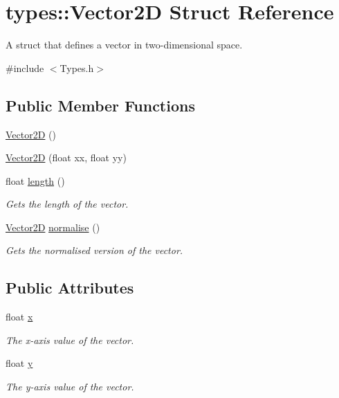 \hypertarget{structtypes_1_1_vector2_d}{}\section{types\+:\+:Vector2\+D Struct Reference}
\label{structtypes_1_1_vector2_d}


A struct that defines a vector in two-\/dimensional space.  




{\ttfamily \#include $<$Types.\+h$>$}

\subsection*{Public Member Functions}
\begin{DoxyCompactItemize}
\item 
\hyperlink{structtypes_1_1_vector2_d_adda77a848bdd16a1a5ef040f6b2eb22a}{Vector2\+D} ()
\item 
\hyperlink{structtypes_1_1_vector2_d_a45963f2c1d710efa66c4e43ca84537f3}{Vector2\+D} (float xx, float yy)
\item 
float \hyperlink{structtypes_1_1_vector2_d_ac46977660e97a02defb9410870b287b7}{length} ()
\begin{DoxyCompactList}\small\item\em Gets the length of the vector. \end{DoxyCompactList}\item 
\hyperlink{structtypes_1_1_vector2_d}{Vector2\+D} \hyperlink{structtypes_1_1_vector2_d_a22ca9b713366281646e78f5e0287b008}{normalise} ()
\begin{DoxyCompactList}\small\item\em Gets the normalised version of the vector. \end{DoxyCompactList}\end{DoxyCompactItemize}
\subsection*{Public Attributes}
\begin{DoxyCompactItemize}
\item 
float \hyperlink{structtypes_1_1_vector2_d_a44560592e290e47cf312c76931cace2d}{x}
\begin{DoxyCompactList}\small\item\em The x-\/axis value of the vector. \end{DoxyCompactList}\item 
float \hyperlink{structtypes_1_1_vector2_d_af91db0a84d6cc1645b0b4fc79aca835f}{y}
\begin{DoxyCompactList}\small\item\em The y-\/axis value of the vector. \end{DoxyCompactList}\end{DoxyCompactItemize}


